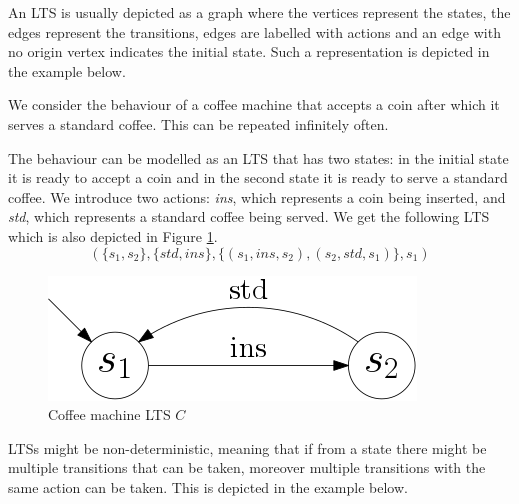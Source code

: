 An LTS is usually depicted as a graph where the vertices represent the states, the edges represent the transitions, edges are labelled with actions and an edge with no origin vertex indicates the initial state. Such a representation is depicted in the example below.
\begin{example}
	We consider the behaviour of a coffee machine that accepts a coin after which it serves a standard coffee. This can be repeated infinitely often. 
	
	The behaviour can be modelled as an LTS that has two states: in the initial state it is ready to accept a coin and in the second state it is ready to serve a standard coffee. We introduce two actions: \textit{ins}, which represents a coin being inserted, and \textit{std}, which represents a standard coffee being served. We get the following LTS which is also depicted in Figure \ref{fig:coffeemachinebasiceurolts}.
	\[ (\{s_1,s_2\},\{std,ins\},\{(s_1,ins,s_2),(s_2,std,s_1)\},s_1)\]
	\begin{figure}[h]
		\centering
		\includegraphics[scale=0.3]{Examples/CoffeeMachine/BasicEuroLTS}
		\caption[Coffee machine LTS]{Coffee machine LTS $C$}
		\label{fig:coffeemachinebasiceurolts}
	\end{figure}
\end{example}

LTSs might be non-deterministic, meaning that if from a state there might be multiple transitions that can be taken, moreover multiple transitions with the same action can be taken. This is depicted in the example below.

